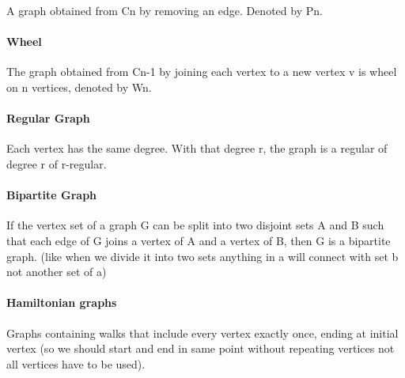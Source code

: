 A graph obtained from Cn by removing an edge. Denoted by Pn.

\hypertarget{wheel}{%
\paragraph{Wheel}\label{wheel}}

The graph obtained from Cn-1 by joining each vertex to a new vertex v is
wheel on n vertices, denoted by Wn.

\hypertarget{regular-graph}{%
\paragraph{Regular Graph}\label{regular-graph}}

Each vertex has the same degree. With that degree r, the graph is a
regular of degree r of r-regular.

\hypertarget{bipartite-graph}{%
\paragraph{Bipartite Graph}\label{bipartite-graph}}

If the vertex set of a graph G can be split into two disjoint sets A and
B such that each edge of G joins a vertex of A and a vertex of B, then G
is a bipartite graph. (like when we divide it into two sets anything in
a will connect with set b not another set of a)

\hypertarget{hamiltonian-graphs}{%
\paragraph{Hamiltonian graphs}\label{hamiltonian-graphs}}

Graphs containing walks that include every vertex exactly once, ending
at initial vertex (so we should start and end in same point without
repeating vertices not all vertices have to be used).
